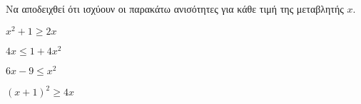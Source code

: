 Να αποδειχθεί ότι ισχύουν οι παρακάτω ανισότητες για κάθε τιμή της μεταβλητής $ x $.
\begin{multicols}{2}
\begin{alist}
\item $ x^2+1\geq 2x $
\item $ 4x\leq 1+4x^2 $
\item $ 6x-9\leq x^2 $
\item $ (x+1)^2\geq 4x $
\end{alist}
\end{multicols}
